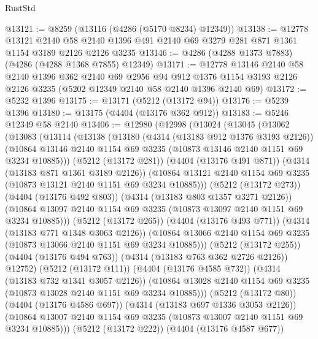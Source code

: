 \begin{lexlean}{RustStd}
\begin{coremodule}
{\begin{coremodule}
{{{{{{{{{{{{{{{{@13121 := @8259 (@13116 (@4286 (@5170 @8234) @12349))
@13138 := @12778
    @13121
    @2140
    @58
    @2140
    @1396
    @491
    @2140
    @69
    @3279
    @281
    @871
    @1361
    @1154
    @3189
    @2126
    @2126
    @3235
@13146 := @4286 (@4288 @1373 @7883) (@4286 (@4288 @1368 @7855) @12349)
@13171 := @12778
    @13146
    @2140
    @58
    @2140
    @1396
    @362
    @2140
    @69
    @2956
    @94
    @912
    @1376
    @1154
    @3193
    @2126
    @2126
    @3235
    (@5202 @12349 @2140 @58 @2140 @1396 @2140 @69)
@13172 := @5232 @1396
@13175 := @13171 (@5212 (@13172 @94))
@13176 := @5239 @1396
@13180 := @13175 (@4404 (@13176 @362 @912))
@13183 := @5246 @12349 @58 @2140
@13406 := @12980
    (@12998
      (@13024
        (@13045
          (@13062
            (@13083
              (@13114
                (@13138
                  (@13180
                    (@4314 (@13183 @912 @1376 @3193 @2126))
                    (@10864
                      @13146
                      @2140
                      @1154
                      @69
                      @3235
                      (@10873 @13146 @2140 @1151 @69 @3234 @10885)))
                  (@5212 (@13172 @281))
                  (@4404 (@13176 @491 @871))
                  (@4314 (@13183 @871 @1361 @3189 @2126))
                  (@10864
                    @13121
                    @2140
                    @1154
                    @69
                    @3235
                    (@10873 @13121 @2140 @1151 @69 @3234 @10885)))
                (@5212 (@13172 @273))
                (@4404 (@13176 @492 @803))
                (@4314 (@13183 @803 @1357 @3271 @2126))
                (@10864 @13097 @2140 @1154 @69 @3235 (@10873 @13097 @2140 @1151 @69 @3234 @10885)))
              (@5212 (@13172 @265))
              (@4404 (@13176 @493 @771))
              (@4314 (@13183 @771 @1348 @3063 @2126))
              (@10864 @13066 @2140 @1154 @69 @3235 (@10873 @13066 @2140 @1151 @69 @3234 @10885)))
            (@5212 (@13172 @255))
            (@4404 (@13176 @494 @763))
            (@4314 (@13183 @763 @362 @2726 @2126))
            @12752)
          (@5212 (@13172 @111))
          (@4404 (@13176 @4585 @732))
          (@4314 (@13183 @732 @1341 @3057 @2126))
          (@10864 @13028 @2140 @1154 @69 @3235 (@10873 @13028 @2140 @1151 @69 @3234 @10885)))
        (@5212 (@13172 @80))
        (@4404 (@13176 @4586 @697))
        (@4314 (@13183 @697 @1336 @3053 @2126))
        (@10864 @13007 @2140 @1154 @69 @3235 (@10873 @13007 @2140 @1151 @69 @3234 @10885)))
      (@5212 (@13172 @222))
      (@4404 (@13176 @4587 @677))
}}}}}}}}}}}}}}}}
\end{coremodule}}
\end{coremodule}
\end{lexlean}

